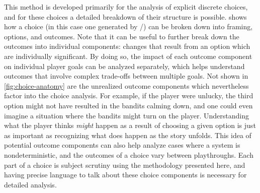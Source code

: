 This method is developed primarily for the analysis of explicit discrete choices, and for these choices a detailed breakdown of their structure is possible.
%
 shows how a choice (in this case one generated by \dunyazad/) can be broken down into framing, options, and outcomes.
%
Note that it can be useful to further break down the outcomes into individual components: changes that result from an option which are individually significant.
%
By doing so, the impact of each outcome component on individual player goals can be analyzed separately, which helps understand outcomes that involve complex trade-offs between multiple goals.
%
Not shown in \cref{fig:choice-anatomy} are the unrealized outcome components which nevertheless factor into the choice analysis.
%
For example, if the player were unlucky, the third option might not have resulted in the bandits calming down, and one could even imagine a situation where the bandits might turn on the player.
%
Understanding what the player thinks \emph{might} happen as a result of choosing a given option is just as important as recognizing what does happen as the story unfolds.
%
This idea of potential outcome components can also help analyze cases where a system is nondeterministic, and the outcomes of a choice vary between playthroughs.
%
Each part of a choice is subject scrutiny using the methodology presented here, and having precise language to talk about these choice components is necessary for detailed analysis.

